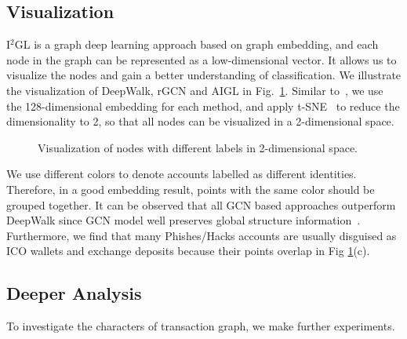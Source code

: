 \subsection{Visualization}
I$^2$GL is a graph deep learning approach based on graph embedding, and each node in the graph can be represented as a low-dimensional vector. It allows us to visualize the nodes and gain a better understanding of classification. We illustrate the visualization of DeepWalk, rGCN and AIGL in Fig.~\ref{fig:visualization}. Similar to~\cite{wang2016structural}, we use the 128-dimensional embedding for each method, and apply t-SNE~\cite{maaten2008visualizing} to reduce the dimensionality to 2, so that all nodes can be visualized in a 2-dimensional space.

\begin{figure}
\centering     %
{}
\caption{Visualization of nodes with different labels in 2-dimensional space.}
\label{fig:visualization}
\end{figure}

We use different colors to denote accounts labelled as different identities. Therefore, in a good embedding result, points with the same color should be grouped together. It can be observed that all GCN based approaches outperform DeepWalk since GCN model well preserves global structure information~\cite{goyal2018graph}. Furthermore, we find that many Phishes/Hacks accounts are usually disguised as ICO wallets and exchange deposits because their points overlap in Fig \ref{fig:visualization}(c).

\subsection{Deeper Analysis}
To investigate the characters of transaction graph, we make further experiments.

